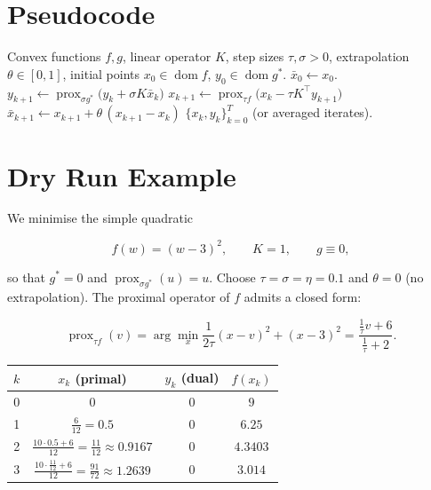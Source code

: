 \documentclass{article}
\newcommand{\prox}{\operatorname{prox}}
\newcommand{\dom}{\operatorname{dom}}
\begin{document}
\section*{Pseudocode}
\begin{algorithm}[H]
\caption{Primal–Dual Hybrid Gradient (PDHG)}\label{alg:pdhg}
\begin{algorithmic}[1]
\Require Convex functions $f,g$, linear operator $K$, step sizes $\tau,\sigma>0$, extrapolation $\theta\in[0,1]$,
initial points $x_{0}\in\dom f$, $y_{0}\in\dom g^{*}$.
\State $ \bar x_{0}\gets x_{0}$.
    \State $y_{k+1}\gets \prox_{\sigma g^{*}}\!\bigl(y_{k}+\sigma K\bar x_{k}\bigr)$ 
    \State $x_{k+1}\gets \prox_{\tau f}\!\bigl(x_{k}-\tau K^{\top}y_{k+1}\bigr)$ 
    \State $ \bar x_{k+1}\gets x_{k+1}+\theta\,(x_{k+1}-x_{k})$ 
\EndFor
\State \Return $\{x_{k},y_{k}\}_{k=0}^{T}$ (or averaged iterates).
\end{algorithmic}
\end{algorithm}

\section*{Dry Run Example}
We minimise the simple quadratic  

\[
f(w)=(w-3)^{2},\qquad K=1,\qquad g\equiv0,
\]

so that $g^{*}=0$ and $\prox_{\sigma g^{*}}(u)=u$.  
Choose $\tau=\sigma=\eta=0.1$ and $\theta=0$ (no extrapolation).  
The proximal operator of $f$ admits a closed form:

\[
\prox_{\tau f}(v)=\arg\min_{x}\frac{1}{2\tau}(x-v)^{2}+(x-3)^{2}
               =\frac{\frac{1}{\tau}v+6}{\frac{1}{\tau}+2}.
\tag{3}
\]

\begin{center}
\begin{tabular}{c|c|c|c}
$k$ & $x_{k}$ (primal) & $y_{k}$ (dual) & $f(x_{k})$\\\hline
0 & $0$ & $0$ & $9$\\
1 & $\displaystyle\frac{6}{12}=0.5$ & $0$ & $6.25$\\
2 & $\displaystyle\frac{10\cdot0.5+6}{12}= \frac{11}{12}\approx0.9167$ & $0$ & $4.3403$\\
3 & $\displaystyle\frac{10\cdot\frac{11}{12}+6}{12}= \frac{91}{72}\approx1.2639$ & $0$ & $3.014$\\
\end{tabular}
\end{center}
\end{document}
